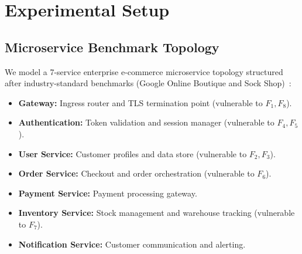 \documentclass[ASNA,twocolumn]{USG}
\begin{document}
\section{Experimental Setup}
\label{sec:setup}

\subsection{Microservice Benchmark Topology}
We model a 7-service enterprise e-commerce microservice topology structured after industry-standard benchmarks (Google Online Boutique and Sock Shop)~\cite{aderaldo2025declarative, soldani2023microservice}:
\begin{itemize}
    \item \textbf{Gateway:} Ingress router and TLS termination point (vulnerable to $F_1, F_8$).
    \item \textbf{Authentication:} Token validation and session manager (vulnerable to $F_4, F_5$).
    \item \textbf{User Service:} Customer profiles and data store (vulnerable to $F_2, F_3$).
    \item \textbf{Order Service:} Checkout and order orchestration (vulnerable to $F_6$).
    \item \textbf{Payment Service:} Payment processing gateway.
    \item \textbf{Inventory Service:} Stock management and warehouse tracking (vulnerable to $F_7$).
    \item \textbf{Notification Service:} Customer communication and alerting.
\end{itemize}
\end{document}
